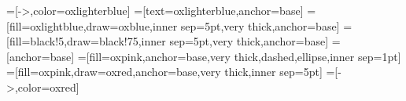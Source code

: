 
\newcommand\defeq{\coloneqq}


\usepackage[british,UKenglish]{babel}
\usepackage[T1]{fontenc}
\usepackage{stmaryrd}
\usepackage{mathtools}
\usepackage{amsmath}
\usepackage{amssymb}
\usepackage{amsfonts}
\usepackage{amsthm}
\usepackage{tabularx}

\usepackage{listings}
\usepackage{stackengine}

\usepackage{tikz}
\usetikzlibrary{positioning}
\usetikzlibrary{arrows.meta, decorations.pathreplacing, shadows}

\newcommand\sinti[2]{{#1}\llbracket#2\rrbracket}


\DeclareMathOperator{\dom}{dom}


\usepackage{graphbox}
\usepackage{mdframed}

\usepackage{style/beamerthemeoxon}

\usepackage{tikz}
\usetikzlibrary{calc, positioning, shapes.arrows,matrix,fit,patterns}
\usepackage{tabularx}
\usepackage{pifont}

\newcommand{\cmark}{\color{oxgreen}\ding{51}}%
\newcommand{\xmark}{\color{oxdarkerred}\ding{55}}

\usepackage{multirow}
\usepackage{tikz-cd}



=[->,color=oxlighterblue]
=[text=oxlighterblue,anchor=base]
=[fill=oxlightblue,draw=oxblue,inner sep=5pt,very
      thick,anchor=base]
=[fill=black!5,draw=black!75,inner sep=5pt,very
      thick,anchor=base]
      =[anchor=base]
      =[fill=oxpink,anchor=base,very
  thick,dashed,ellipse,inner sep=1pt]
  =[fill=oxpink,draw=oxred,anchor=base,very
  thick,inner sep=5pt]
  =[->,color=oxred]

  


\newtheorem{proposition}[theorem]{Proposition}